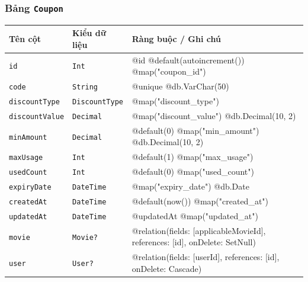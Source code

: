 \subsubsection{Bảng \texttt{Coupon}}
\begin{longtable}{|p{3.6cm}|p{3.0cm}|p{8.9cm}|}
\hline
\rowcolor{headerblue} \textbf{Tên cột} & \textbf{Kiểu dữ liệu} & \textbf{Ràng buộc / Ghi chú} \\ \hline
\endhead
\texttt{id} & \texttt{Int} & \small @id @default(autoincrement()) @map("coupon\_id") \\ \hline
\texttt{code} & \texttt{String} & \small @unique @db.VarChar(50) \\ \hline
\texttt{discountType} & \texttt{DiscountType} & \small @map("discount\_type") \\ \hline
\texttt{discountValue} & \texttt{Decimal} & \small @map("discount\_value") @db.Decimal(10, 2) \\ \hline
\texttt{minAmount} & \texttt{Decimal} & \small @default(0) @map("min\_amount") @db.Decimal(10, 2) \\ \hline
\texttt{maxUsage} & \texttt{Int} & \small @default(1) @map("max\_usage") \\ \hline
\texttt{usedCount} & \texttt{Int} & \small @default(0) @map("used\_count") \\ \hline
\texttt{expiryDate} & \texttt{DateTime} & \small @map("expiry\_date") @db.Date \\ \hline
\texttt{createdAt} & \texttt{DateTime} & \small @default(now()) @map("created\_at") \\ \hline
\texttt{updatedAt} & \texttt{DateTime} & \small @updatedAt @map("updated\_at") \\ \hline
\texttt{movie} & \texttt{Movie?} & \small @relation(fields: [applicableMovieId], references: [id], onDelete: SetNull) \\ \hline
\texttt{user} & \texttt{User?} & \small @relation(fields: [userId], references: [id], onDelete: Cascade) \\ \hline
\end{longtable}

